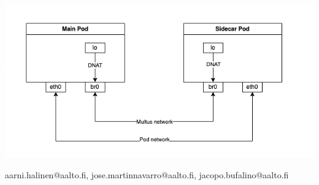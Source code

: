 \documentclass[portrait,a1,final]{a0poster}
\begin{document}
\begin{minipage}{\posterwidth}
\begin{minipage}[t]{\doublecolumnwidth}
    \includegraphics[width=\linewidth]{figures/multus.png}
  \end{minipage}
\end{minipage}

\makefooter
  {
    aarni.halinen@aalto.fi,
    jose.martinnavarro@aalto.fi,
    jacopo.bufalino@aalto.fi
  }
\end{document}
